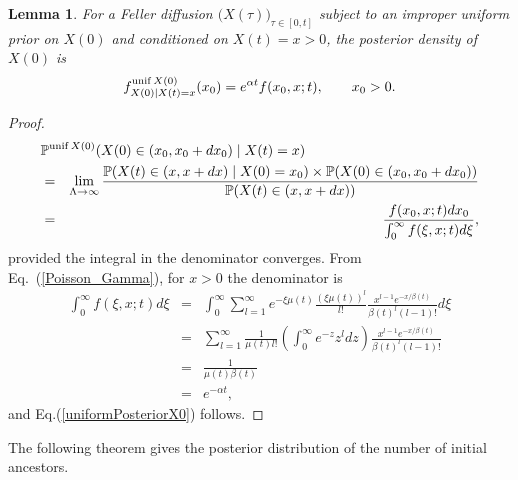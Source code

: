 \documentclass[preprint,12pt]{elsarticle}
\newtheorem{lemma}{Lemma}
\begin{document}
\begin{lemma}	\label{lemma:PosteriorX0}
For a Feller diffusion $\big(X(\tau)\big)_{\tau \in [0, t]}$ subject to an improper uniform prior on $X(0)$ and conditioned on $X(t) = x > 0$, the posterior 
density of $X(0)$ is 
\begin{equation}		\label{uniformPosteriorX0}
f^{{\rm unif}\,X(0)}_{X(0) \mid X(t) = x}(x_0) = e^{\alpha t} f(x_0, x; t), \qquad x_0 > 0.  
\end{equation}
\end{lemma}
%
\begin{proof}
\begin{eqnarray*}
\lefteqn{\mathbb{P}^{{\rm unif}\,X(0)}(X(0) \in (x_0, x_0 + dx_0) \mid X(t) = x)  } \nonumber \\
	& = & \lim_{\Lambda \to \infty} \frac{\mathbb{P}(X(t) \in (x, x + dx) \mid X(0) = x_0) \times \mathbb{P}(X(0) \in (x_0, x_0 + dx_0))}
						{\mathbb{P}(X(t) \in (x, x + dx))} \nonumber \\
	& = & \frac{f(x_0, x; t) dx_0}{\int_0^\infty f(\xi, x; t) d\xi },  					
\end{eqnarray*}
provided the integral in the denominator converges.  From Eq.~(\ref{Poisson_Gamma}), for $x > 0$ the denominator is 
\begin{eqnarray*}
\int_0^\infty f(\xi, x; t) d\xi & = & \int_0^\infty \sum_{l = 1}^\infty e^{-\xi \mu(t)} \frac{(\xi \mu(t))^l}{l!} \frac{x^{l - 1} e^{-x/\beta(t)}}{\beta(t)^l (l - 1)!} d\xi \\
	& = & \sum_{l = 1}^\infty \frac{1}{\mu(t) l!} \left(\int_0^\infty e^{-z} z^l dz\right)  \frac{x^{l - 1} e^{-x/\beta(t)}}{\beta(t)^l (l - 1)!} \\
	& = & \frac{1}{\mu(t)\beta(t)} \\
	& = & e^{-\alpha t},  
\end{eqnarray*}
and Eq.(\ref{uniformPosteriorX0}) follows.  
\end{proof}

The following theorem gives the posterior distribution of the number of initial ancestors.  
\end{document}
